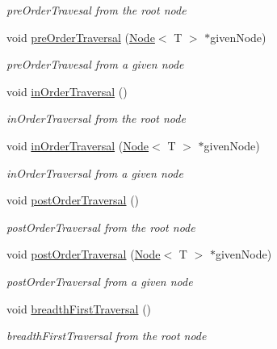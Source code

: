 \begin{DoxyCompactItemize}
\begin{DoxyCompactList}\small\item\em pre\-Order\-Travesal from the root node \end{DoxyCompactList}\item 
void \hyperlink{classbinaryTree_1_1BinaryTree_af7c8afc9eed5189283b8b188195eb171}{pre\-Order\-Traversal} (\hyperlink{structbinaryTree_1_1Node}{Node}$<$ T $>$ $\ast$given\-Node)
\begin{DoxyCompactList}\small\item\em pre\-Order\-Travesal from a given node \end{DoxyCompactList}\item 
void \hyperlink{classbinaryTree_1_1BinaryTree_ac698ef815ef2070b9cef00da006f1499}{in\-Order\-Traversal} ()
\begin{DoxyCompactList}\small\item\em in\-Order\-Traversal from the root node \end{DoxyCompactList}\item 
void \hyperlink{classbinaryTree_1_1BinaryTree_a45ad89139b915b0c24d0e2ac812b545b}{in\-Order\-Traversal} (\hyperlink{structbinaryTree_1_1Node}{Node}$<$ T $>$ $\ast$given\-Node)
\begin{DoxyCompactList}\small\item\em in\-Order\-Traversal from a given node \end{DoxyCompactList}\item 
void \hyperlink{classbinaryTree_1_1BinaryTree_a253ebeb47bc56d441b7f58b83fed182d}{post\-Order\-Traversal} ()
\begin{DoxyCompactList}\small\item\em post\-Order\-Traversal from the root node \end{DoxyCompactList}\item 
void \hyperlink{classbinaryTree_1_1BinaryTree_a48de4d016b00cde76da6a8773eee5e52}{post\-Order\-Traversal} (\hyperlink{structbinaryTree_1_1Node}{Node}$<$ T $>$ $\ast$given\-Node)
\begin{DoxyCompactList}\small\item\em post\-Order\-Traversal from a given node \end{DoxyCompactList}\item 
void \hyperlink{classbinaryTree_1_1BinaryTree_a70a4c6b978b21172d25e4bad214bc901}{breadth\-First\-Traversal} ()
\begin{DoxyCompactList}\small\item\em breadth\-First\-Traversal from the root node \end{DoxyCompactList}\item 

\end{DoxyCompactItemize}
